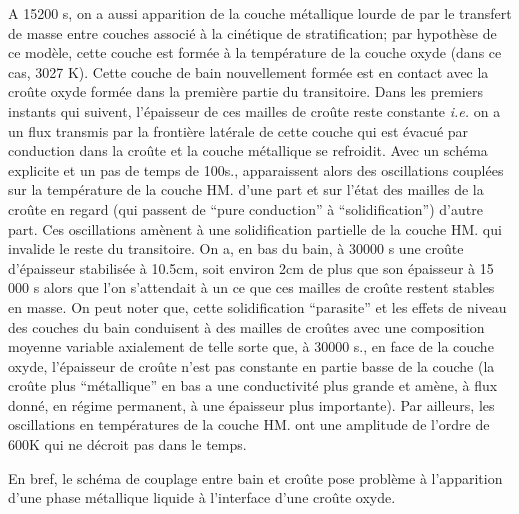 A 15200 s, on a aussi apparition de la couche métallique lourde de par le transfert de masse entre couches associé à la cinétique de stratification; par hypothèse de ce modèle, cette couche est formée à la température de la couche oxyde (dans ce cas, 3027 K). Cette couche de bain nouvellement formée est en contact avec la croûte oxyde formée dans la première partie du transitoire. Dans les premiers instants qui suivent, l'épaisseur de ces mailles de croûte reste constante \textit{i.e.} on a un flux transmis par la frontière latérale de cette couche qui est évacué par conduction dans la croûte et la couche métallique se refroidit. Avec un schéma explicite et un pas de temps de 100s., apparaissent alors des oscillations couplées sur la température de la couche HM. d'une part et sur l'état des mailles de la croûte en regard (qui passent de ``pure conduction'' à ``solidification'') d'autre part. Ces oscillations amènent à une solidification partielle de la couche HM. qui invalide le reste du transitoire. On a, en bas du bain, à 30000 s une croûte d'épaisseur stabilisée à 10.5cm, soit environ 2cm de plus que son épaisseur à 15 000 s alors que l'on s'attendait à un ce que ces mailles de croûte restent stables en masse. On peut noter que, cette solidification ``parasite'' et les effets de niveau des couches du bain conduisent à des mailles de croûtes avec une composition moyenne variable axialement de telle sorte que, à 30000 s., en face de la couche oxyde, l'épaisseur de croûte n'est pas constante en partie basse de la couche (la croûte plus ``métallique'' en bas a une conductivité plus grande et amène, à flux donné, en régime permanent, à une épaisseur plus importante). Par ailleurs, les oscillations en températures de la couche HM. ont une amplitude de l'ordre de 600K qui ne décroit pas dans le temps.

En bref, le schéma de couplage entre bain et croûte pose problème à l'apparition d'une phase métallique liquide à l'interface d'une croûte oxyde.

